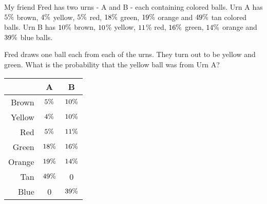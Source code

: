 

\question[5]
  My friend Fred has two urns - A and B - each containing colored balls. Urn A
  has $5\%$ brown, $4\%$ yellow, $5\%$ red, $18\%$ green, $19\%$ orange and $49\%$ tan 
  colored balls. Urn B has $10\%$ brown, $10$\% yellow, $11$\% red, $16\%$ green,
  $14\%$ orange and $39\%$ blue balls. 
  
  Fred draws one ball each from each of the urns. They turn out to be yellow and
  green. What is the probability that the yellow ball was from Urn A?

\watchout

\ifprintanswers
    \begin{tabular}[t]{rcc}
       \toprule
       & A & B \\
       \midrule
       Brown & $5\%$ & $10\%$ \\
       Yellow & $4\%$ & $10\%$ \\
       Red & $5\%$ & $11\%$ \\
       Green & $18\%$ & $16\%$ \\
       Orange & $19\%$ & $14\%$ \\ 
       Tan & $49\%$ & 0 \\
       Blue & 0 & $39\%$\\
       \bottomrule
    \end{tabular}
\fi 

